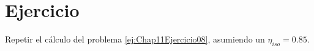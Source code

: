 \section{Ejercicio}\label{ej:Chap11Ejercicio09}
Repetir el cálculo del problema \ref{ej:Chap11Ejercicio08}, asumiendo un $\eta_{iso}=0.85$.